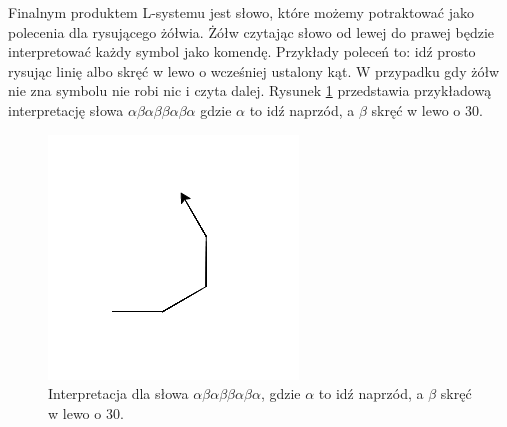 \documentclass[inz,longabstract]{iithesis}
\begin{document}
            Finalnym produktem L-systemu jest słowo, które możemy potraktować jako polecenia dla rysującego żółwia. Żółw czytając słowo od lewej do prawej będzie interpretować każdy symbol jako komendę. Przykłady poleceń to: idź prosto rysując linię albo skręć w lewo o wcześniej ustalony kąt. W przypadku gdy żółw nie zna symbolu nie robi nic i czyta dalej. Rysunek \ref{fig:turtleExample} przedstawia przykładową interpretację słowa $\alpha\beta\alpha\beta\beta\alpha\beta\alpha$ gdzie $\alpha$ to idź naprzód, a $\beta$ skręć w lewo o 30\degree.
            \begin{figure}[H]
                \includegraphics[width=\linewidth]{turtleExample.png}
                \caption{Interpretacja dla słowa $\alpha\beta\alpha\beta\beta\alpha\beta\alpha$, gdzie $\alpha$ to idź naprzód, a $\beta$ skręć w lewo o 30\degree.}
                \label{fig:turtleExample}
            \end{figure}
            
\end{document}
